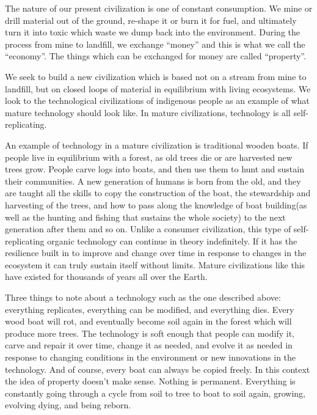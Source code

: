 

The nature of our present civilization is one of constant consumption.
We mine or drill material out of the ground, re-shape it or burn it for
fuel, and ultimately turn it into toxic which waste we dump back into
the environment. During the process from mine to landfill, we exchange
``money'' and this is what we call the ``economy''. The things which can
be exchanged for money are called ``property''.

We seek to build a new civilization which is based not on a stream from
mine to landfill, but on closed loops of material in equilibrium with
living ecosystems. We look to the technological civilizations of
indigenous people as an example of what mature technology should look
like. In mature civilizations, technology is all self-replicating.

An example of technology in a mature civilization is traditional wooden
boats. If people live in equilibrium with a forest, as old trees die or
are harvested new trees grow. People carve logs into boats, and then use
them to hunt and sustain their communities. A new generation of humans
is born from the old, and they are taught all the skills to copy the
construction of the boat, the stewardship and harvesting of the trees,
and how to pass along the knowledge of boat building(as well as the
hunting and fishing that sustains the whole society) to the next
generation after them and so on. Unlike a consumer civilization, this
type of self-replicating organic technology can continue in theory
indefinitely. If it has the resilience built in to improve and change
over time in response to changes in the ecosystem it can truly sustain
itself without limits. Mature civilizations like this have existed for
thousands of years all over the Earth.

Three things to note about a technology such as the one described above:
everything replicates, everything can be modified, and everything dies.
Every wood boat will rot, and eventually become soil again in the forest
which will produce more trees. The technology is soft enough that people
can modify it, carve and repair it over time, change it as needed, and
evolve it as needed in response to changing conditions in the
environment or new innovations in the technology. And of course, every
boat can always be copied freely. In this context the idea of property
doesn't make sense. Nothing is permanent. Everything is constantly going
through a cycle from soil to tree to boat to soil again, growing,
evolving dying, and being reborn.

